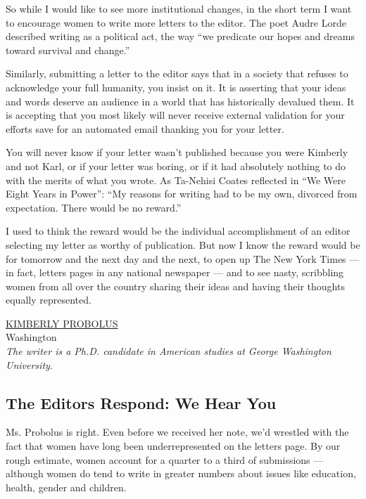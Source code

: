 So while I would like to see more institutional changes, in the short
term I want to encourage women to write more letters to the editor. The
poet Audre Lorde described writing as a political act, the way ``we
predicate our hopes and dreams toward survival and change.''

Similarly, submitting a letter to the editor says that in a society that
refuses to acknowledge your full humanity, you insist on it. It is
asserting that your ideas and words deserve an audience in a world that
has historically devalued them. It is accepting that you most likely
will never receive external validation for your efforts save for an
automated email thanking you for your letter.

You will never know if your letter wasn't published because you were
Kimberly and not Karl, or if your letter was boring, or if it had
absolutely nothing to do with the merits of what you wrote. As Ta-Nehisi
Coates reflected in ``We Were Eight Years in Power'': ``My reasons for
writing had to be my own, divorced from expectation. There would be no
reward.''

I used to think the reward would be the individual accomplishment of an
editor selecting my letter as worthy of publication. But now I know the
reward would be for tomorrow and the next day and the next, to open up
The New York Times --- in fact, letters pages in any national newspaper
--- and to see nasty, scribbling women from all over the country sharing
their ideas and having their thoughts equally represented.

\href{https://americanstudies.columbian.gwu.edu/kimberly-probolus}{KIMBERLY
PROBOLUS}\\
Washington\\
\emph{The writer is a Ph.D. candidate in American studies at George
Washington University.}

\hypertarget{the-editors-respond-we-hear-you}{%
\subsection{The Editors Respond: We Hear
You}\label{the-editors-respond-we-hear-you}}

Ms. Probolus is right. Even before we received her note, we'd wrestled
with the fact that women have long been underrepresented on the letters
page. By our rough estimate, women account for a quarter to a third of
submissions --- although women do tend to write in greater numbers about
issues like education, health, gender and children.

